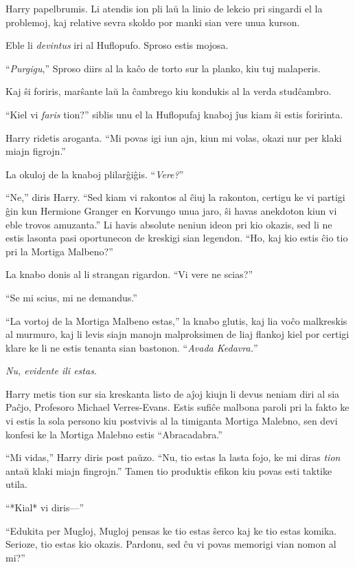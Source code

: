 Harry papelbrumis. Li atendis ion pli laŭ la linio de lekcio pri
singardi el la problemoj, kaj relative sevra skoldo por manki sian
vere unua kurson.

Eble li \emph{devintus} iri al Huflopufo. Sproso estis mojosa.

``\emph{Purgigu},''
Sproso diirs al la kaĉo de torto sur la planko, kiu tuj malaperis.

Kaj ŝi foriris, marŝante laŭ la ĉambrego kiu kondukis al la verda studĉambro.


``Kiel vi \emph{faris} tion?'' siblis unu el la Huflopufaj knaboj ĵus
kiam ŝi estis foririnta.

Harry ridetis aroganta. ``Mi povas igi iun ajn, kiun mi volas, okazi
nur per klaki miajn figrojn.''

La okuloj de la knaboj plilarĝiĝis. ``\emph{Vere?}''

``Ne,'' diris Harry. ``Sed kiam vi rakontos al ĉiuj la rakonton,
certigu ke vi partigi ĝin kun Hermione Granger en Korvungo unua jaro,
ŝi havas anekdoton kiun vi eble trovos amuzanta.'' Li havis absolute
neniun ideon pri kio okazis, sed li ne estis lasonta pasi oportunecon
de kreskigi sian legendon. ``Ho, kaj kio estis ĉio tio pri la Mortiga
Malbeno?''

La knabo donis al li strangan rigardon. ``Vi vere ne scias?''

``Se mi scius, mi ne demandus.''

``La vortoj de la Mortiga Malbeno estas,'' la knabo glutis, kaj lia
voĉo malkreskis al murmuro, kaj li levis siajn manojn malproksimen de
liaj flankoj kiel por certigi klare ke li ne estis tenanta sian
bastonon. ``\emph{Avada Kedavra.}''

\emph{Nu, evidente ili estas.}

Harry metis tion sur sia kreskanta listo de aĵoj kiujn li devus neniam
diri al sia Paĉjo, Profesoro Michael Verres-Evans. Estis sufiĉe
malbona paroli pri la fakto ke vi estis la sola persono kiu postvivis
al la timiganta Mortiga Malebno, sen devi konfesi ke la Mortiga
Malebno estis ``Abracadabra.''

``Mi vidas,'' Harry diris post paŭzo. ``Nu, tio estas la lasta fojo,
ke mi diras \emph{tion} antaŭ klaki miajn fingrojn.'' Tamen tio
produktis efikon kiu povas esti taktike utila.

``*Kial* vi diris—''

``Edukita per Mugloj, Mugloj pensas ke tio estas ŝerco kaj ke tio
estas komika. Serioze, tio estas kio okazis. Pardonu, sed ĉu vi povas
memorigi vian nomon al mi?''

